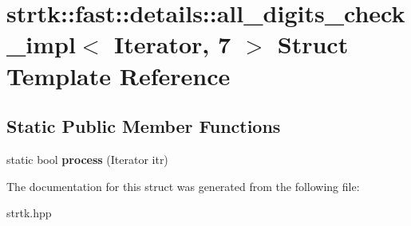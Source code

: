 \hypertarget{structstrtk_1_1fast_1_1details_1_1all__digits__check__impl_3_01Iterator_00_017_01_4}{\section{strtk\-:\-:fast\-:\-:details\-:\-:all\-\_\-digits\-\_\-check\-\_\-impl$<$ Iterator, 7 $>$ Struct Template Reference}
\label{structstrtk_1_1fast_1_1details_1_1all__digits__check__impl_3_01Iterator_00_017_01_4}
}
\subsection*{Static Public Member Functions}
\begin{DoxyCompactItemize}
\item 
\hypertarget{structstrtk_1_1fast_1_1details_1_1all__digits__check__impl_3_01Iterator_00_017_01_4_a3ff1e3574eab2687a5a6477ffce3432e}{static bool {\bfseries process} (Iterator itr)}\label{structstrtk_1_1fast_1_1details_1_1all__digits__check__impl_3_01Iterator_00_017_01_4_a3ff1e3574eab2687a5a6477ffce3432e}

\end{DoxyCompactItemize}


The documentation for this struct was generated from the following file\-:\begin{DoxyCompactItemize}
\item 
strtk.\-hpp\end{DoxyCompactItemize}
